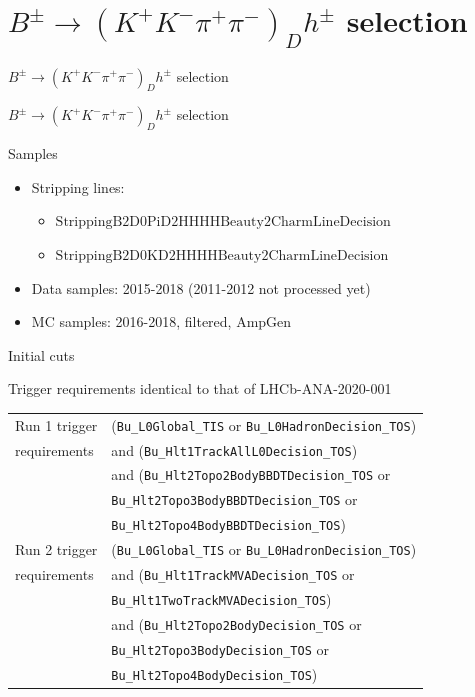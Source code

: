 \documentclass{beamer}
\begin{document}
\section{\texorpdfstring{$B^\pm\to(K^+K^-\pi^+\pi^-)_Dh^\pm$}{B to K+ K- pi+ pi- h} selection}
\begin{frame}{$B^\pm\to(K^+K^-\pi^+\pi^-)_Dh^\pm$ selection}
  \begin{center}
    {\huge $B^\pm\to(K^+K^-\pi^+\pi^-)_Dh^\pm$ selection}
  \end{center}
\end{frame}

\begin{frame}{Samples}
  \begin{itemize}
    \setlength\itemsep{1.2em}
    \item{Stripping lines:}
    \begin{itemize}
      \item{$\text{StrippingB2D0PiD2HHHHBeauty2CharmLineDecision}$}
      \item{$\text{StrippingB2D0KD2HHHHBeauty2CharmLineDecision}$}
    \end{itemize}
    \item{Data samples: 2015-2018 (2011-2012 not processed yet)}
    \item{MC samples: 2016-2018, filtered, AmpGen}
  \end{itemize}
\end{frame}

\begin{frame}{Initial cuts}
  \begin{center}
    Trigger requirements identical to that of LHCb-ANA-2020-001
  \end{center}
  \centering
  \def\arraystretch{1.2}%
  \begin{tabular}{|l|l|}
    \hline
    Run 1 trigger        & (\texttt{Bu\_L0Global\_TIS} or \texttt{Bu\_L0HadronDecision\_TOS}) \\
    requirements         & and (\texttt{Bu\_Hlt1TrackAllL0Decision\_TOS}) \\
                         & and (\texttt{Bu\_Hlt2Topo2BodyBBDTDecision\_TOS} or \\
                         & \texttt{Bu\_Hlt2Topo3BodyBBDTDecision\_TOS} or \\
                         & \texttt{Bu\_Hlt2Topo4BodyBBDTDecision\_TOS}) \\
    \hline
    Run 2 trigger        & (\texttt{Bu\_L0Global\_TIS} or \texttt{Bu\_L0HadronDecision\_TOS}) \\
    requirements         & and (\texttt{Bu\_Hlt1TrackMVADecision\_TOS} or \\
                         & \texttt{Bu\_Hlt1TwoTrackMVADecision\_TOS}) \\
                         & and (\texttt{Bu\_Hlt2Topo2BodyDecision\_TOS} or \\
                         & \texttt{Bu\_Hlt2Topo3BodyDecision\_TOS} or \\
                         & \texttt{Bu\_Hlt2Topo4BodyDecision\_TOS}) \\
    \hline
  \end{tabular}
\end{frame}
\end{document}
